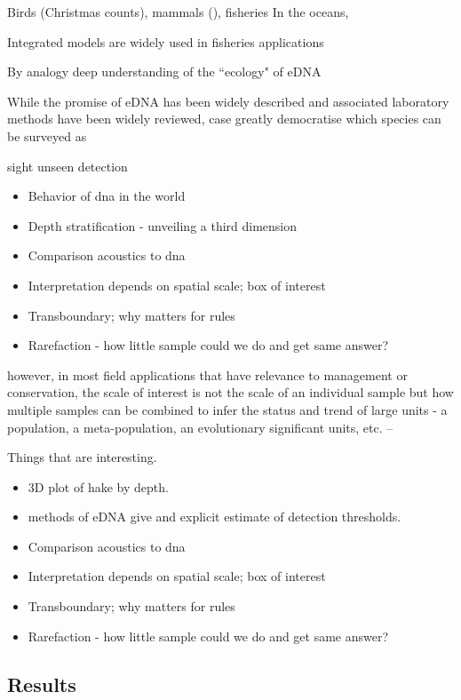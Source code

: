 \documentclass[
]{article}
\providecommand{\tightlist}{%
  \setlength{\itemsep}{0pt}\setlength{\parskip}{0pt}}
\begin{document}
Birds (Christmas counts), mammals (), fisheries In the oceans,

Integrated models are widely used in fisheries applications

By analogy deep understanding of the ``ecology" of eDNA

While the promise of eDNA has been widely described and associated
laboratory methods have been widely reviewed, case greatly democratise
which species can be surveyed as

sight unseen detection

\begin{itemize}
\tightlist
\item
  Behavior of dna in the world
\item
  Depth stratification - unveiling a third dimension
\item
  Comparison acoustics to dna
\item
  Interpretation depends on spatial scale; box of interest
\item
  Transboundary; why matters for rules
\item
  Rarefaction - how little sample could we do and get same answer?
\end{itemize}

however, in most field applications that have relevance to management or
conservation, the scale of interest is not the scale of an individual
sample but how multiple samples can be combined to infer the status and
trend of large units - a population, a meta-population, an evolutionary
significant units, etc. --

Things that are interesting.

\begin{itemize}
\tightlist
\item
  3D plot of hake by depth.
\item
  methods of eDNA give and explicit estimate of detection thresholds.
\item
  Comparison acoustics to dna
\item
  Interpretation depends on spatial scale; box of interest
\item
  Transboundary; why matters for rules
\item
  Rarefaction - how little sample could we do and get same answer?
\end{itemize}

\hypertarget{results}{%
\subsection{Results}\label{results}}
\end{document}

